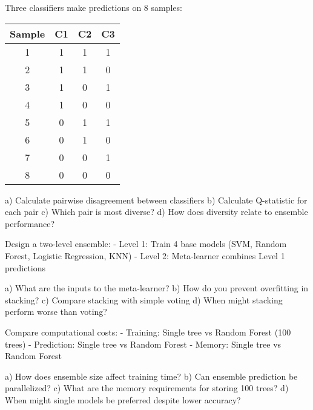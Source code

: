 \documentclass{article}
\newcounter{exercise}
\begin{document}
\begin{tcolorbox}[colback=gray!5!white,colframe=gray!75!black,title=Problem \stepcounter{exercise}: Ensemble Diversity Measures]

Three classifiers make predictions on 8 samples:
\begin{center}
\begin{tabular}{|c|c|c|c|}
\hline
Sample & C1 & C2 & C3 \\
\hline
1 & 1 & 1 & 1 \\
2 & 1 & 1 & 0 \\
3 & 1 & 0 & 1 \\
4 & 1 & 0 & 0 \\
5 & 0 & 1 & 1 \\
6 & 0 & 1 & 0 \\
7 & 0 & 0 & 1 \\
8 & 0 & 0 & 0 \\
\hline
\end{tabular}
\end{center}

a) Calculate pairwise disagreement between classifiers
b) Calculate Q-statistic for each pair
c) Which pair is most diverse?
d) How does diversity relate to ensemble performance?
\end{tcolorbox}

\begin{tcolorbox}[colback=gray!5!white,colframe=gray!75!black,title=Problem \stepcounter{exercise}: Stacking vs Voting]

Design a two-level ensemble:
- Level 1: Train 4 base models (SVM, Random Forest, Logistic Regression, KNN)
- Level 2: Meta-learner combines Level 1 predictions

a) What are the inputs to the meta-learner?
b) How do you prevent overfitting in stacking?
c) Compare stacking with simple voting
d) When might stacking perform worse than voting?
\end{tcolorbox}

\begin{tcolorbox}[colback=gray!5!white,colframe=gray!75!black,title=Problem \stepcounter{exercise}: Computational Complexity]

Compare computational costs:
- Training: Single tree vs Random Forest (100 trees)
- Prediction: Single tree vs Random Forest
- Memory: Single tree vs Random Forest

a) How does ensemble size affect training time?
b) Can ensemble prediction be parallelized?
c) What are the memory requirements for storing 100 trees?
d) When might single models be preferred despite lower accuracy?
\end{tcolorbox}
\end{document}

